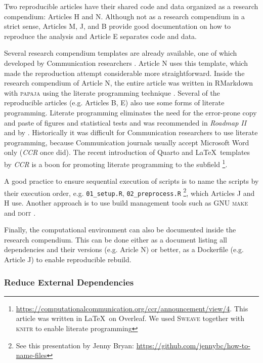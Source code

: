Two reproducible articles have their shared code and data organized as a research compendium: Articles H and N. Although not as a research compendium in a strict sense, Articles M, J, and B provide good documentation on how to reproduce the analysis and Article E separates code and data.

Several research compendium templates are already available, one of which developed by Communication researchers \parencite[]{vanccs}. Article N uses this template, which made the reproduction attempt considerable more straightforward. Inside the research compendium of Article N, the entire article was written in RMarkdown with \textsc{papaja} \parencite[]{papajarpkg} using the literate programming technique \parencite[mixing of prose with programming code,][]{knuth:1984}. Several of the reproducible articles (e.g. Articles B, E) also use some forms of literate programming. Literate programming eliminates the need for the error-prone copy and paste of figures and statistical tests and was recommended in \textit{Roadmap II} and by \textcite{lewis:2019:OCS}. Historically it was difficult for Communication researchers to use literate programming, because Communication journals usually accept Microsoft Word only (\textit{CCR} once did). The recent introduction of Quarto and \LaTeX~templates by \textit{CCR} is a boon for promoting literate programming to the subfield \footnote{\url{https://computationalcommunication.org/ccr/announcement/view/4}. This article was written in \LaTeX~on Overleaf. We used \textsc{Sweave} \parencite[]{leisch2002sweave} together with \textsc{knitr} \parencite[]{knitrrpkg} to enable literate programming}.

A good practice to ensure sequential execution of scripts is to name the scripts by their execution order, e.g. \texttt{01\_setup.R}, \texttt{02\_preprocess.R} \footnote{See this presentation by Jenny Bryan: \url{https://github.com/jennybc/how-to-name-files}}, which Articles J and H use. Another approach is to use build management tools such as \textsc{GNU make} \parencite[][Article N uses this]{stallman1988gnu} and \textsc{doit} \parencite[][which the original compendium uses]{schettino:2021}.

Finally, the computational environment can also be documented inside the research compendium. This can be done either as a document listing all dependencies and their versions (e.g. Aricle N) or better, as a Dockerfile (e.g. Article J) to enable reproducible rebuild.

\subsubsection{Reduce External Dependencies}

